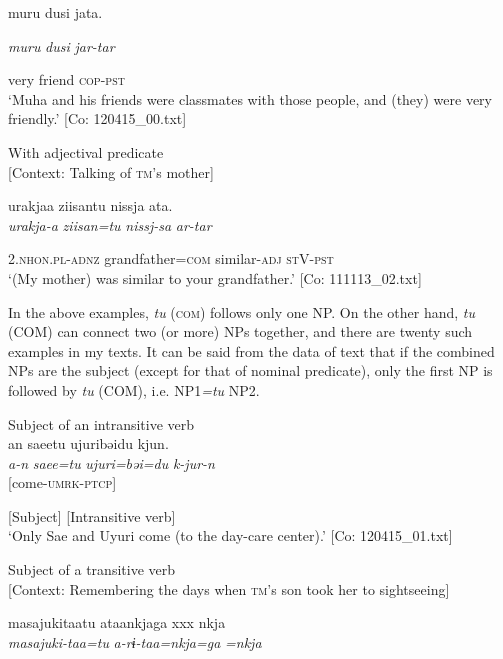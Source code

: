 \begin{table}
      muru  dusi  jata.

      \textit{muru}  \textit{dusi}  \textit{jar-tar}

      very  friend  \textsc{cop}-\textsc{pst}\\
\glt ‘Muha and his friends were classmates with those people, and (they) were very friendly.’ [Co: 120415\_00.txt]
\z

\ex With adjectival predicate\\{}
[Context: Talking of \textsc{tm}’s mother]

{\TM}
\glll urakjaa  ziisantu  nissja  ata.\\

      \textit{urakja-a}  \textit{ziisan=tu}  \textit{nissj-sa}  \textit{ar-tar}

      2.\textsc{nhon}.\textsc{pl}-\textsc{adnz}  grandfather=\textsc{com}  similar-\textsc{adj}  \textsc{st}V-\textsc{pst}\\
\glt ‘(My mother) was similar to your grandfather.’ [Co: 111113\_02.txt]
\z

In the above examples, \textit{tu} (\textsc{com}) follows only one NP. On the other hand, \textit{tu} (COM) can connect two (or more) NPs together, and there are twenty such examples in my texts. It can be said from the data of text that if the combined NPs are the subject (except for that of nominal predicate), only the first NP is followed by \textit{tu} (COM), i.e. NP1\textit{=tu} NP2.

\ea\label{ex:6-74}
\ea Subject of an intransitive verb\\
{\TM}
\glll  an  saeetu  ujuribəidu  kjun.\\
\textit{a-n}  \textit{saee=tu}  \textit{ujuri=bəi=du}  \textit{k-jur-n}\\
[\textsc{dist}-\textsc{adnz}  Sae=tu  Uyuri=only=\textsc{foc}]  [come-\textsc{umrk}-\textsc{ptcp}]

      [Subject]  [Intransitive verb]\\
\glt ‘Only Sae and Uyuri come (to the day-care center).’ [Co: 120415\_01.txt]
\z

\ex Subject of a transitive verb\\{}
[Context: Remembering the days when \textsc{tm}’s son took her to sightseeing]

{\TM}
\glll masajukitaatu  ataankjaga  xxx  nkja\\

      \textit{masajuki-taa=tu}  \textit{a-rɨ-taa=nkja=ga}    \textit{=nkja}


\end{table}
